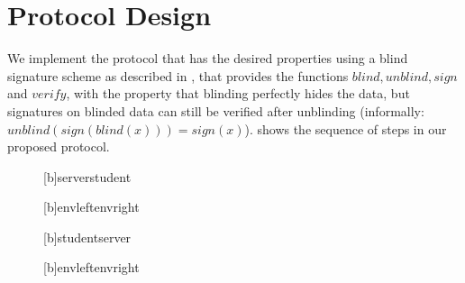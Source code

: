 \section{Protocol Design}
    \label{section:document-submission-system:design-implementation}
We implement the protocol that has the desired properties using a blind
signature scheme as described in \cite{chaum_blind_1982}, that provides the functions $blind, unblind, sign$ and
$verify$, with the property that blinding perfectly hides the data, but
signatures on blinded data can still be verified after unblinding
(informally: $unblind(sign(blind(x))) = sign(x)$).
%
 shows the sequence of steps in our proposed protocol.
%
\begin{figure}[p]%
    \centering
	\renewcommand{\msckeyword}{}
	\scriptsize
	\begin{msc}{}
		\setlength{\labeldist}{3ex}
		\setlength{\labeldist}{1ex}

		\nextlevel[3]

		[b]{server}{student} 
		\nextlevel[1.7]

		[b]{envleft}{envright}
		\nextlevel[1]

		\nextlevel[4.5]

		[b]{student}{server} 
		\nextlevel[1.5]

		[b]{envleft}{envright}
		\nextlevel[1]

		\setlength{\inlineoverlap}{22mm}
				\nextlevel[2.5]


\end{msc}
\end{figure}

